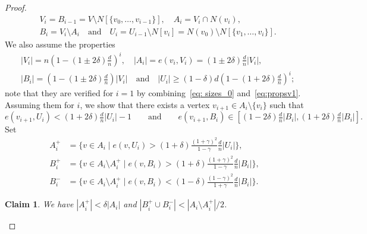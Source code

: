 \documentclass[reqno,a4paper]{amsart}
\newtheorem{claim}[theorem]{Claim}
\theoremstyle{definition}
\begin{document}
\begin{proof}
\begin{align*}
    &V_i=B_{i-1}=V\setminus N[\{v_0,\ldots,v_{i-1}\}] ,\quad  A_i=V_i\cap N(v_i),\\
    &B_i=V_i\setminus A_i \quad  \text{and} \quad  U_i=U_{i-1}\setminus N[v_i]=N(v_0)\setminus N[\{v_1,\ldots,v_{i}\}].
\end{align*}
We also assume the properties 
\begin{equation}\label{eq: sizes_i}
\begin{split}
    &|V_i|=n \left(1-\left(1\pm 2\delta\right)\frac{d}{n}\right)^i,\quad  |A_i|=e(v_i,V_i)=\left(1\pm 2\delta\right)\frac{d}{n}|V_i|,\\
    &|B_i|=\left(1-\left(1\pm 2\delta\right)\frac{d}{n}\right)|V_i| \quad  \text{and} \quad  |U_i|\ge (1-\delta)d\left(1-\left(1+2\delta\right)\frac{d}{n}\right)^i;
\end{split}
\end{equation}
note that they are verified for $i=1$ by combining~\eqref{eq: sizes_0} and~\eqref{eq:propsv1}. Assuming them for $i$, we show that there exists a vertex $v_{i+1}\in A_i\setminus\{v_i\}$ such that 
\begin{equation}\label{eq:propsvi}
e(v_{i+1},U_i)<\left(1+ 2\delta\right)\tfrac{d}{n}|U_i|-1\qquad \text{and}\qquad e(v_{i+1},B_i)\in [(1- 2\delta)\tfrac{d}{n}|B_i|,(1+2\delta)\tfrac{d}{n}|B_i|]. 
\end{equation}
Set
\begin{align*}
A_i^+ 
&= \big\{v \in A_i \mid e(v,U_i) > (1+\delta)\tfrac{(1+\gamma)^2}{1-\gamma}\tfrac{d}{n}|U_i|\big\},\\[6pt]
B_i^+ 
&= \big\{v \in A_i\setminus A_i^+ \mid e(v,B_i) > (1+\delta)\tfrac{(1+\gamma)^2}{1-\gamma}\tfrac{d}{n}|B_i|\big\},\\[6pt]
B_i^- 
&= \big\{v \in A_i\setminus A_i^+ \mid e(v,B_i) < (1-\delta)\tfrac{(1-\gamma)^2}{1+\gamma}\tfrac{d}{n}|B_i|\big\}.
\end{align*}

\begin{claim}\label{cl:Ai}
We have $|A_i^+| < \delta |A_i|$ and $|B_i^+ \cup B_i^-| < |A_i \setminus A_i^+|/2$.
\end{claim}


\end{proof}
\end{document}
